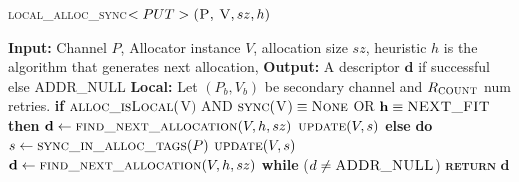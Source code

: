 \documentclass[10pt]{article}
\begin{document}

\begin{algorithm}{}
\footnotesize
\caption{\textsc{local\_alloc\_sync}{$<PUT>\textsc{(P, V}, sz, h)$}}
\label{alg:lalloc} 
\begin{algorithmic}[1]


\STATE \textbf{Input:} Channel $P$, Allocator instance $V$, allocation size $sz$, heuristic $h$
is the algorithm that generates next allocation, 
\STATE \textbf{Output:} A descriptor {$\textbf{d}$} if successful else \textsc{ADDR\_NULL}
\STATE \textbf{Local:} Let $(P_{b}, V_{b})$ be secondary channel and $R_{\textsc{COUNT}}$ num retries.
\STATE \textbf{if} $\textsc{alloc\_isLocal}($V$)$ AND $\textsc{sync}($V$) \equiv \textsc{None}$ OR $\textbf{h} \equiv \textsc{NEXT\_FIT}$  \textbf{then} 
\STATE \quad $\textbf{d} \leftarrow  \textsc{find\_next\_allocation}(V, h, sz)$ 
\STATE \quad $\textsc{update}(V, s)$
\STATE \textbf{else}
\STATE \quad \textbf{do}
\STATE \qquad $s \gets \textsc{sync\_in\_alloc\_tags}(P)$
\STATE \qquad $\textsc{update}(V, s)$
\STATE \qquad $\textbf{d} \leftarrow  \textsc{find\_next\_allocation}(V, h, sz)$
\STATE \quad \textbf{while} ($d \neq \textsc{ADDR\_NULL}$)
\STATE \textsc{\textbf{return}} {$\textbf{d}$}
\STATE


\end{algorithmic}
\end{algorithm}


\end{document}
